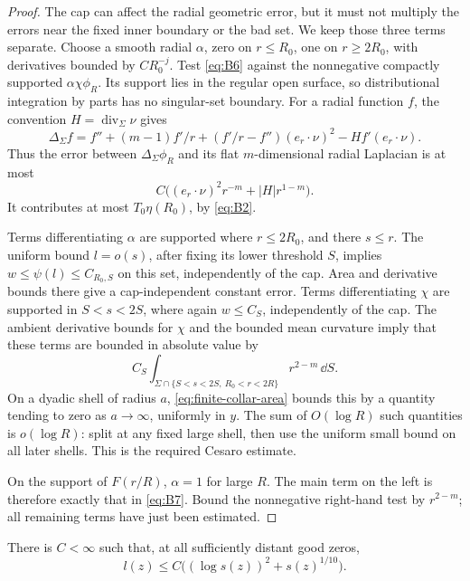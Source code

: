 \begin{proof}
The cap can affect the radial geometric error, but it must not multiply
the errors near the fixed inner boundary or the bad set. We keep those
three terms separate.
Choose a smooth radial \(\alpha\), zero on \(r\le R_0\), one on
\(r\ge2R_0\), with derivatives bounded by \(C R_0^{-j}\).
Test \eqref{eq:B6} against the nonnegative compactly supported
\(\alpha\chi\phi_R\).  Its support lies in the regular open surface,
so distributional integration by parts has no singular-set boundary.
For a radial function \(f\), the convention \(H=\operatorname{div}_\Sigma\nu\) gives
\[
 \Delta_\Sigma f
 =f''+(m-1)f'/r
 +(f'/r-f'')(e_r\cdot\nu)^2-Hf'(e_r\cdot\nu).
\]
Thus the error between \(\Delta_\Sigma\phi_R\) and its flat
\(m\)-dimensional radial Laplacian is at most
\[
 C\bigl((e_r\cdot\nu)^2r^{-m}+|H|r^{1-m}\bigr).
\]
It contributes at most \(T_0\eta(R_0)\), by \eqref{eq:B2}.

Terms differentiating \(\alpha\) are supported where \(r\le2R_0\),
and there \(s\le r\).  The uniform bound \(l=o(s)\), after fixing
its lower threshold \(S\), implies \(w\le\psi(l)\le C_{R_0,S}\)
on this set, independently of the cap.  Area and derivative bounds
there give a cap-independent constant error.
Terms differentiating \(\chi\) are supported in \(S<s<2S\), where
again \(w\le C_S\), independently of the cap.  The ambient derivative
bounds for \(\chi\) and the bounded mean curvature imply that these
terms are bounded in absolute value by
\[
 C_S\int_{\Sigma\cap\{S<s<2S,\ R_0<r<2R\}}
                   r^{2-m}\,\dd S.
\]
On a dyadic shell of radius \(a\), \eqref{eq:finite-collar-area}
bounds this by a quantity tending to zero as \(a\to\infty\),
uniformly in \(y\).  The sum of \(O(\log R)\) such quantities is
\(o(\log R)\): split at any fixed large shell, then use the uniform
small bound on all later shells.  This is the required Cesaro
estimate.

On the support of \(F(r/R)\), \(\alpha=1\) for large \(R\).
The main term on the left is therefore exactly that in
\eqref{eq:B7}.  Bound the nonnegative right-hand test by
\(r^{2-m}\); all remaining terms have just been estimated.
\end{proof}

\begin{lemma}\label{lem:finite-rough}
There is \(C<\infty\) such that, at all sufficiently distant good zeros,
\begin{equation}\label{eq:B8}
 l(z)\le C\bigl((\log s(z))^2+s(z)^{1/10}\bigr).
\end{equation}
\end{lemma}

